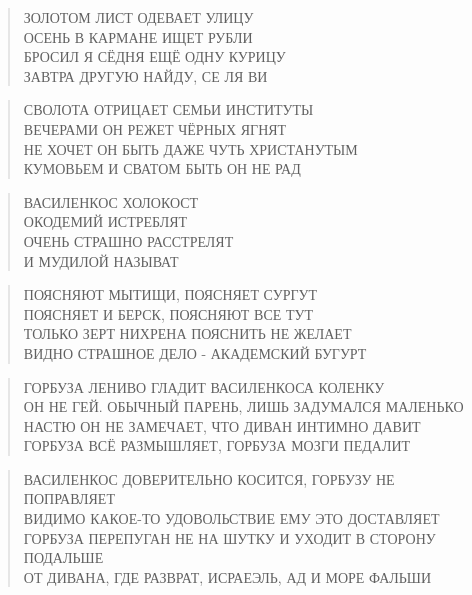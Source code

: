 \poemtitle{***}
\begin{verse}
ЗОЛОТОМ ЛИСТ ОДЕВАЕТ УЛИЦУ\\
ОСЕНЬ В КАРМАНЕ ИЩЕТ РУБЛИ\\
БРОСИЛ Я СЁДНЯ ЕЩЁ ОДНУ КУРИЦУ\\
ЗАВТРА ДРУГУЮ НАЙДУ, СЕ ЛЯ ВИ
\end{verse}

\poemtitle{***}
\begin{verse}
СВОЛОТА ОТРИЦАЕТ СЕМЬИ ИНСТИТУТЫ\\
ВЕЧЕРАМИ ОН РЕЖЕТ ЧЁРНЫХ ЯГНЯТ\\
НЕ ХОЧЕТ ОН БЫТЬ ДАЖЕ ЧУТЬ ХРИСТАНУТЫМ\\
КУМОВЬЕМ И СВАТОМ БЫТЬ ОН НЕ РАД
\end{verse}

\poemtitle{***}
\begin{verse}
ВАСИЛЕНКОС ХОЛОКОСТ\\
ОКОДЕМИЙ ИСТРЕБЛЯТ\\
ОЧЕНЬ СТРАШНО РАССТРЕЛЯТ\\
И МУДИЛОЙ НАЗЫВАТ
\end{verse}

\poemtitle{***}
\begin{verse}
ПОЯСНЯЮТ МЫТИЩИ, ПОЯСНЯЕТ СУРГУТ\\
ПОЯСНЯЕТ И БЕРСК, ПОЯСНЯЮТ ВСЕ ТУТ\\
ТОЛЬКО ЗЕРТ НИХРЕНА ПОЯСНИТЬ НЕ ЖЕЛАЕТ\\
ВИДНО СТРАШНОЕ ДЕЛО - АКАДЕМСКИЙ БУГУРТ
\end{verse}

\poemtitle{***}
\begin{verse}
ГОРБУЗА ЛЕНИВО ГЛАДИТ ВАСИЛЕНКОСА КОЛЕНКУ\\
ОН НЕ ГЕЙ. ОБЫЧНЫЙ ПАРЕНЬ, ЛИШЬ ЗАДУМАЛСЯ МАЛЕНЬКО\\
НАСТЮ ОН НЕ ЗАМЕЧАЕТ, ЧТО ДИВАН ИНТИМНО ДАВИТ\\
ГОРБУЗА ВСЁ РАЗМЫШЛЯЕТ, ГОРБУЗА МОЗГИ ПЕДАЛИТ
\end{verse}

\poemtitle{***}
\begin{verse}
ВАСИЛЕНКОС ДОВЕРИТЕЛЬНО КОСИТСЯ, ГОРБУЗУ НЕ ПОПРАВЛЯЕТ\\
ВИДИМО КАКОЕ-ТО УДОВОЛЬСТВИЕ ЕМУ ЭТО ДОСТАВЛЯЕТ\\
ГОРБУЗА ПЕРЕПУГАН НЕ НА ШУТКУ И УХОДИТ В СТОРОНУ ПОДАЛЬШЕ\\
ОТ ДИВАНА, ГДЕ РАЗВРАТ, ИСРАЕЭЛЬ, АД И МОРЕ ФАЛЬШИ
\end{verse}

